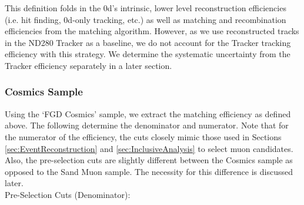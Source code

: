 This definition folds in the \p0d's intrinsic, lower level reconstruction efficiencies (i.e. hit finding, \p0d-only tracking, etc.) as well as matching and recombination efficiencies from the matching algorithm. However, as we use reconstructed tracks in the ND280 Tracker as a baseline, we do not account for the Tracker tracking efficiency with this strategy. We determine the systematic uncertainty from the Tracker efficiency separately in a later section.\\

\subsubsection{Cosmics Sample}
\label{sec:CosmicsEfficiency}

Using the `FGD Cosmics' sample, we extract the matching efficiency as defined above. The following determine the denominator and numerator. Note that for the numerator of the efficiency, the cuts closely mimic those used in Sections \ref{sec:EventReconstruction} and \ref{sec:InclusiveAnalysis} to select muon candidates. Also, the pre-selection cuts are slightly different between the Cosmics sample as opposed to the Sand Muon sample. The necessity for this difference is discussed later.\\

Pre-Selection Cuts (Denominator):

